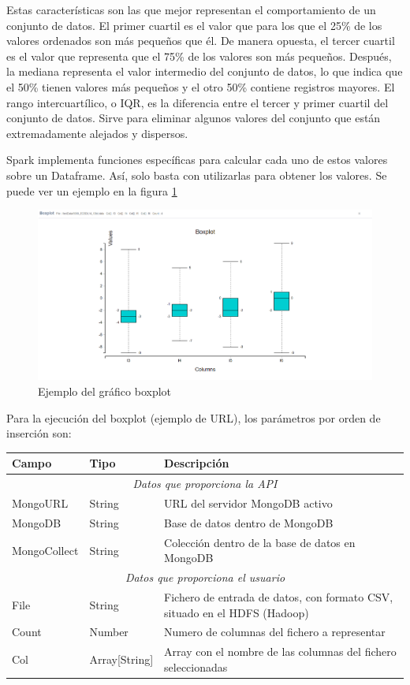 Estas características son las que mejor representan el comportamiento de un conjunto de datos. El primer cuartil es el valor que para los que el 25\% de los valores ordenados son más pequeños que él. De manera opuesta, el tercer cuartil es el valor que representa que el 75\% de los valores son más pequeños. Después, la mediana representa el valor intermedio del conjunto de datos, lo que indica que el 50\% tienen valores más pequeños y el otro 50\% contiene registros mayores. El rango intercuartílico, o IQR, es la diferencia entre el tercer y primer cuartil del conjunto de datos. Sirve para eliminar algunos valores del conjunto que están extremadamente alejados y dispersos.

Spark implementa funciones específicas para calcular cada uno de estos valores sobre un Dataframe. Así, solo basta con utilizarlas para obtener los valores. Se puede ver un ejemplo en la figura \ref{fig:ejemploboxplot}
\begin{figure}
	\centering
	\includegraphics[width=1\linewidth]{imagenes/ejemplo_boxplot}
	\caption{Ejemplo del gráfico boxplot}
	\label{fig:ejemploboxplot}
\end{figure}

Para la ejecución del boxplot (ejemplo de URL\footnotemark), los parámetros por orden de inserción son:

\begin{tabular}{|l|l|p{7cm}|}
	\hline 
	\textbf{Campo} & \textbf{Tipo} & \textbf{Descripción} \\ 
	\hline \hline
	\multicolumn{3}{|c|}{\textit{Datos que proporciona la API}} \\
	\hline 
	MongoURL & String & URL del servidor MongoDB activo \\ 
	\hline 
	MongoDB & String & Base de datos dentro de MongoDB \\ 
	\hline 
	MongoCollect& String & Colección dentro de la base de datos en MongoDB \\ 
	\hline \hline
	\multicolumn{3}{|c|}{\textit{Datos que proporciona el usuario}} \\
	\hline 
	File & String & Fichero de entrada de datos, con formato CSV, situado en el HDFS (Hadoop) \\ 
	\hline 
	Count & Number & Numero de columnas del fichero a representar \\ 
	\hline 
	Col & Array[String] & Array con el nombre de las columnas del fichero seleccionadas \\ 
	\hline 
\end{tabular} 

